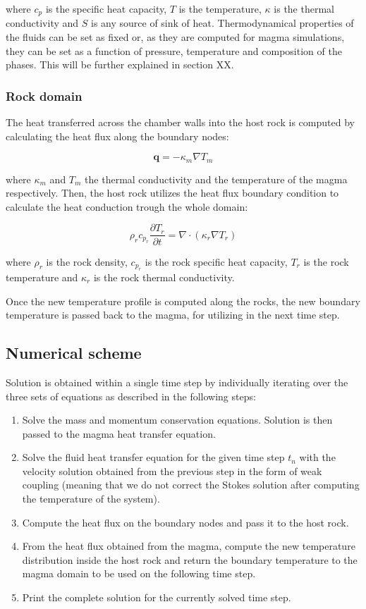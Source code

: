 where $c_p$ is the specific heat capacity, $T$ is the temperature, $\kappa$ is the thermal conductivity and $S$ is any source of sink of heat. Thermodynamical properties of the fluids can be set as fixed or, as they are computed for magma simulations, they can be set as a function of pressure, temperature and composition of the phases. This will be further explained in section XX.

\subsubsection{Rock domain}
The heat transferred across the chamber walls into the host rock is computed by calculating the heat flux along the boundary nodes:

\begin{equation}
\mathbf{q} = -\kappa_m \nabla T_m
\end{equation}

where $\kappa_m$ and $T_m$ the thermal conductivity and the temperature of the magma respectively. Then, the host rock utilizes the heat flux boundary condition to calculate the heat conduction trough the whole domain:

\begin{equation}
\rho_r c_{p_r} \frac{\partial T_r}{\partial t} = \nabla \cdot \left( \kappa_r \nabla T_r \right)
\end{equation}

where $\rho_r$ is the rock density, $c_{p_r}$ is the rock specific heat capacity, $T_r$ is the rock temperature and $\kappa_r$ is the rock thermal conductivity.

Once the new temperature profile is computed along the rocks, the new boundary temperature is passed back to the magma, for utilizing in the next time step.

\subsection{Numerical scheme}
Solution is obtained within a single time step by individually iterating over the three sets of equations as described in the following steps:

\begin{enumerate}
    \item Solve the mass and momentum conservation equations. Solution is then passed to the magma heat transfer equation.
    \item Solve the fluid heat transfer equation for the given time step $t_n$ with the velocity solution obtained from the previous step in the form of weak coupling (meaning that we do not correct the Stokes solution after computing the temperature of the system).
    \item Compute the heat flux on the boundary nodes and pass it to the host rock.
    \item From the heat flux obtained from the magma, compute the new temperature distribution inside the host rock and return the boundary temperature to the magma domain to be used on the following time step.
    \item Print the complete solution for the currently solved time step.
\end{enumerate}

